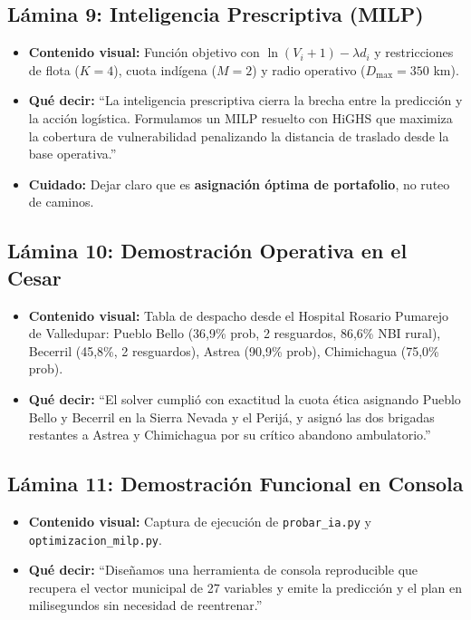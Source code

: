 \documentclass[11pt,a4paper]{article}
\newcommand{\code}[1]{\texttt{#1}}
\begin{document}
\subsection{Lámina 9: Inteligencia Prescriptiva (MILP)}
\begin{itemize}[leftmargin=*]
  \item \textbf{Contenido visual:} Función objetivo con $\ln(V_i + 1) - \lambda d_i$ y restricciones de flota ($K=4$), cuota indígena ($M=2$) y radio operativo ($D_{\max}=350$ km).
  \item \textbf{Qué decir:} ``La inteligencia prescriptiva cierra la brecha entre la predicción y la acción logística. Formulamos un MILP resuelto con HiGHS que maximiza la cobertura de vulnerabilidad penalizando la distancia de traslado desde la base operativa.''
  \item \textbf{Cuidado:} Dejar claro que es \textbf{asignación óptima de portafolio}, no ruteo de caminos.
\end{itemize}

\subsection{Lámina 10: Demostración Operativa en el Cesar}
\begin{itemize}[leftmargin=*]
  \item \textbf{Contenido visual:} Tabla de despacho desde el Hospital Rosario Pumarejo de Valledupar: Pueblo Bello (36,9\% prob, 2 resguardos, 86,6\% NBI rural), Becerril (45,8\%, 2 resguardos), Astrea (90,9\% prob), Chimichagua (75,0\% prob).
  \item \textbf{Qué decir:} ``El solver cumplió con exactitud la cuota ética asignando Pueblo Bello y Becerril en la Sierra Nevada y el Perijá, y asignó las dos brigadas restantes a Astrea y Chimichagua por su crítico abandono ambulatorio.''
\end{itemize}

\subsection{Lámina 11: Demostración Funcional en Consola}
\begin{itemize}[leftmargin=*]
  \item \textbf{Contenido visual:} Captura de ejecución de \code{probar_ia.py} y \code{optimizacion_milp.py}.
  \item \textbf{Qué decir:} ``Diseñamos una herramienta de consola reproducible que recupera el vector municipal de 27 variables y emite la predicción y el plan en milisegundos sin necesidad de reentrenar.''
\end{itemize}
\end{document}
